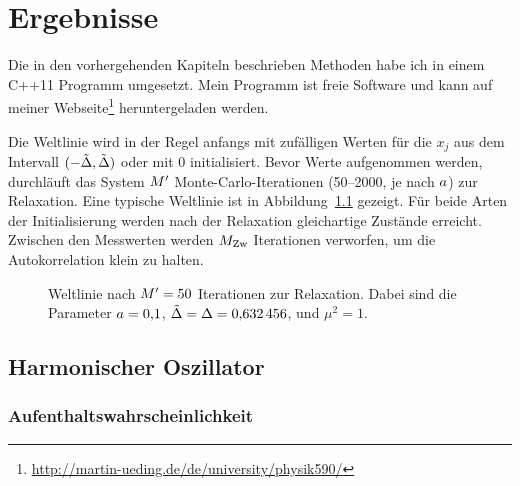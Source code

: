 \chapter{Ergebnisse}

Die in den vorhergehenden Kapiteln beschrieben Methoden habe ich in einem C++11
Programm umgesetzt. Mein Programm ist freie Software und kann auf meiner
Webseite\footnote{\url{http://martin-ueding.de/de/university/physik590/}}
heruntergeladen werden.

Die Weltlinie wird in der Regel anfangs mit zufälligen Werten für die $x_j$ aus
dem Intervall $(-\tilde \Delta, \tilde \Delta)$ oder mit 0
initialisiert. Bevor Werte aufgenommen werden, durchläuft das System
$M'$ Monte-Carlo-Iterationen (\numrange{50}{2000}, je nach
$a$) zur Relaxation. Eine typische Weltlinie ist in
Abbildung~\ref{fig:relaxiert} gezeigt. Für beide Arten der Initialisierung
werden nach der Relaxation gleichartige Zustände erreicht. Zwischen den
Messwerten werden $M_\text{Zw}$ Iterationen verworfen, um die
Autokorrelation klein zu halten.

\begin{figure}[htbp]
    \centering
    \caption{%
        Weltlinie nach $M' = \num{50}$ Iterationen zur Relaxation.
        Dabei sind die Parameter $a = \num{0.1}$, $\tilde \Delta
        = \Delta = \num{0.632456}$, und $\mu^2 = \num{1}$.
    }
    \label{fig:relaxiert}
\end{figure}

\section{Harmonischer Oszillator}

\subsection{Aufenthaltswahrscheinlichkeit}


